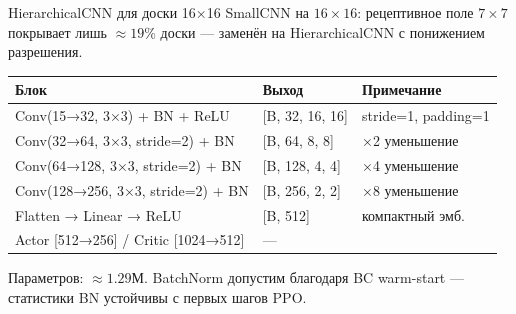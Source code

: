 \documentclass[aspectratio=169]{beamer}
\begin{document}
	\begin{frame}{HierarchicalCNN для доски 16×16}
		SmallCNN на $16\times16$: рецептивное поле $7\times7$ покрывает лишь $\approx19\%$ доски — заменён на HierarchicalCNN с понижением разрешения.

		\bigskip
		\begin{center}
			\begin{tabular}{@{}lll@{}}
				\toprule
				\rowcolor{ThemeGridStroke}
				\color{ThemeCellFilled}Блок & \color{ThemeCellFilled}Выход & \color{ThemeCellFilled}Примечание \\
				\midrule
				Conv(15→32, 3×3) + BN + ReLU  & [B, 32, 16, 16] & stride=1, padding=1 \\
				Conv(32→64, 3×3, stride=2) + BN  & [B, 64, 8, 8]   & ×2 уменьшение \\
				Conv(64→128, 3×3, stride=2) + BN & [B, 128, 4, 4]  & ×4 уменьшение \\
				Conv(128→256, 3×3, stride=2) + BN & [B, 256, 2, 2] & ×8 уменьшение \\
				Flatten → Linear → ReLU          & [B, 512]        & компактный эмб. \\
				Actor [512→256] / Critic [1024→512] & —             & \\
				\bottomrule
			\end{tabular}
		\end{center}

		\bigskip
		Параметров: $\approx1.29$М. BatchNorm допустим благодаря BC warm-start — статистики BN устойчивы с первых шагов PPO.
	\end{frame}
\end{document}
